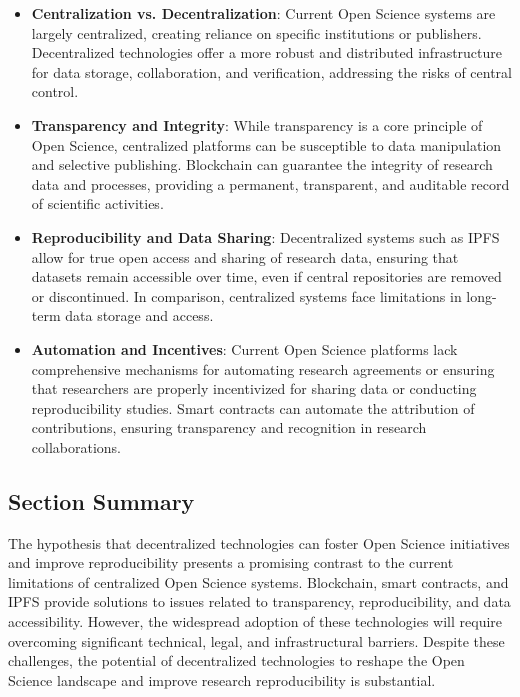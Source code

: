\documentclass[final]{rc-book-2.14}
\begin{document}
\begin{itemize}
    \item \textbf{Centralization vs. Decentralization}: Current Open Science systems are largely centralized, creating reliance on specific institutions or publishers. Decentralized technologies offer a more robust and distributed infrastructure for data storage, collaboration, and verification, addressing the risks of central control.
    \item \textbf{Transparency and Integrity}: While transparency is a core principle of Open Science, centralized platforms can be susceptible to data manipulation and selective publishing. Blockchain can guarantee the integrity of research data and processes, providing a permanent, transparent, and auditable record of scientific activities.
    \item \textbf{Reproducibility and Data Sharing}: Decentralized systems such as IPFS allow for true open access and sharing of research data, ensuring that datasets remain accessible over time, even if central repositories are removed or discontinued. In comparison, centralized systems face limitations in long-term data storage and access.
    \item \textbf{Automation and Incentives}: Current Open Science platforms lack comprehensive mechanisms for automating research agreements or ensuring that researchers are properly incentivized for sharing data or conducting reproducibility studies. Smart contracts can automate the attribution of contributions, ensuring transparency and recognition in research collaborations.
\end{itemize}


\subsection{Section Summary}
The hypothesis that decentralized technologies can foster Open Science initiatives and improve reproducibility presents a promising contrast to the current limitations of centralized Open Science systems. Blockchain, smart contracts, and IPFS provide solutions to issues related to transparency, reproducibility, and data accessibility. However, the widespread adoption of these technologies will require overcoming significant technical, legal, and infrastructural barriers. Despite these challenges, the potential of decentralized technologies to reshape the Open Science landscape and improve research reproducibility is substantial.
\end{document}
